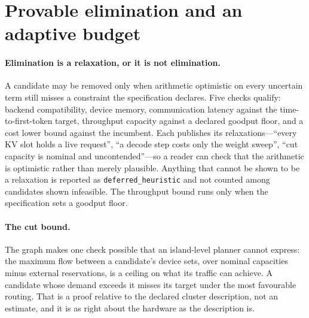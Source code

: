 \section{Provable elimination and an adaptive budget}
\label{sec:search}

\paragraph{Elimination is a relaxation, or it is not elimination.}
A candidate may be removed only when arithmetic optimistic on every uncertain
term still misses a constraint the specification declares. Five checks
qualify: backend compatibility, device memory, communication latency against
the time-to-first-token target, throughput capacity against a declared goodput
floor, and a cost lower bound against the incumbent. Each publishes its
relaxations---``every KV slot holds a live request'', ``a decode step costs
only the weight sweep'', ``cut capacity is nominal and uncontended''---so a
reader can check that the arithmetic is optimistic rather than merely
plausible. Anything that cannot be shown to be a relaxation is reported as
\texttt{deferred\_heuristic} and not counted among candidates shown
infeasible. The throughput bound runs only when the specification sets a
goodput floor.

\paragraph{The cut bound.}
The graph makes one check possible that an island-level planner cannot
express: the maximum flow between a candidate's device sets, over nominal
capacities minus external reservations, is a ceiling on what its traffic can
achieve. A candidate whose demand exceeds it misses its target under the most
favourable routing. That is a proof relative to the declared cluster
description, not an estimate, and it is as right about the hardware as the
description is.

